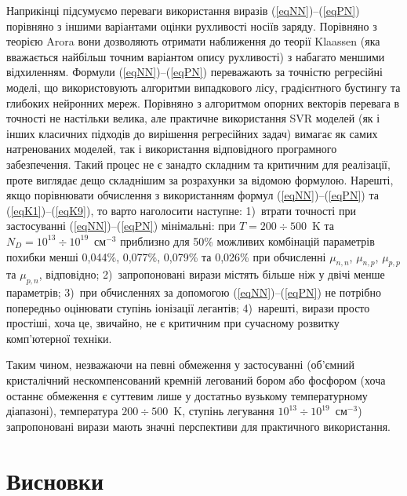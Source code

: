 \documentclass[12pt,a4paper,titlepage,oneside]{book}
\numberwithin{equation}{part}
\begin{document}
Наприкінці підсумуємо переваги використання виразів (\ref{eqNN})--(\ref{eqPN}) порівняно з іншими варіантами оцінки рухливості носіїв заряду.
Порівняно з теорією Arora вони дозволяють отримати наближення до теорії Klaassen (яка вважається найбільш точним варіантом опису рухливості)
з набагато меншими відхиленням.
Формули (\ref{eqNN})--(\ref{eqPN}) переважають за точністю регресійні моделі, що використовують алгоритми 
випадкового лісу, градієнтного бустингу та глибоких нейронних мереж.
Порівняно з алгоритмом опорних векторів перевага в точності не настільки велика, але
практичне використання SVR моделей (як і інших класичних підходів до вирішення регресійних задач)
вимагає як самих натренованих моделей, так і використання відповідного програмного забезпечення.
Такий процес не є занадто складним та критичним для реалізації, проте виглядає дещо складнішим за розрахунки за відомою формулою.
Нарешті, якщо порівнювати обчислення з використанням формул (\ref{eqNN})--(\ref{eqPN}) та (\ref{eqK1})--(\ref{eqK9}),
то варто наголосити наступне:
1)~втрати точності при застосуванні (\ref{eqNN})--(\ref{eqPN}) мінімальні:
при $T=200\div500$~K та $N_D=10^{13}\div10^{19}$~см$^{-3}$ приблизно для 50\% можливих комбінацій параметрів
похибки менші  0,044\%, 0,077\%, 0,079\% та 0,026\% при обчисленні 
$\mu_{n,n}$, $\mu_{n,p}$, $\mu_{p,p}$ та $\mu_{p,n}$, відповідно;
2)~запропоновані вирази містять більше ніж у двічі менше параметрів;
3)~при обчисленнях за допомогою (\ref{eqNN})--(\ref{eqPN}) не потрібно попередньо оцінювати ступінь іонізації легантів;
4)~нарешті, вирази просто простіші, хоча це, звичайно, не є критичним при сучасному розвитку комп'ютерної техніки.

Таким чином, незважаючи на певні обмеження у застосуванні 
(об'ємний кристалічний нескомпенсований кремній легований бором або фосфором
(хоча останнє обмеження є суттевим лише у достатньо вузькому температурному діапазоні), 
температура $200\div500$~K, ступінь легування $10^{13}\div10^{19}$~см$^{-3}$)
запропоновані вирази мають значні перспективи для практичного використання. 




\chapter*{Висновки}
\end{document}
